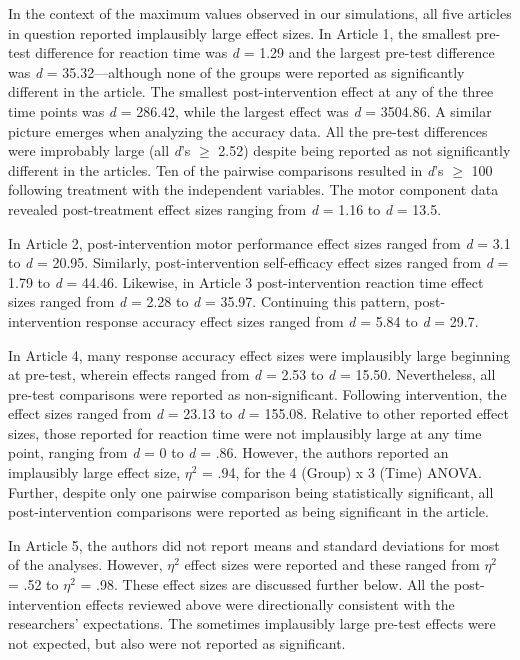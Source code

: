 \documentclass[
  english,
  man, donotrepeattitle,floatsintext]{apa7}
\begin{document}
In the context of the maximum values observed in our simulations, all five articles in question reported implausibly large effect sizes. In Article 1, the smallest pre-test difference for reaction time was \emph{d} = 1.29 and the largest pre-test difference was \emph{d} = 35.32---although none of the groups were reported as significantly different in the article. The smallest post-intervention effect at any of the three time points was \emph{d} = 286.42, while the largest effect was \emph{d} = 3504.86. A similar picture emerges when analyzing the accuracy data. All the pre-test differences were improbably large (all \emph{d}'s \(\geq\) 2.52) despite being reported as not significantly different in the articles. Ten of the pairwise comparisons resulted in \emph{d}'s \(\geq\) 100 following treatment with the independent variables. The motor component data revealed post-treatment effect sizes ranging from \emph{d} = 1.16 to \emph{d} = 13.5.

In Article 2, post-intervention motor performance effect sizes ranged from \emph{d} = 3.1 to \emph{d} = 20.95. Similarly, post-intervention self-efficacy effect sizes ranged from \emph{d} = 1.79 to \emph{d} = 44.46. Likewise, in Article 3 post-intervention reaction time effect sizes ranged from \emph{d} = 2.28 to \emph{d} = 35.97. Continuing this pattern, post-intervention response accuracy effect sizes ranged from \emph{d} = 5.84 to \emph{d} = 29.7.

In Article 4, many response accuracy effect sizes were implausibly large beginning at pre-test, wherein effects ranged from \emph{d} = 2.53 to \emph{d} = 15.50. Nevertheless, all pre-test comparisons were reported as non-significant. Following intervention, the effect sizes ranged from \emph{d} = 23.13 to \emph{d} = 155.08. Relative to other reported effect sizes, those reported for reaction time were not implausibly large at any time point, ranging from \emph{d} = 0 to \emph{d} = .86. However, the authors reported an implausibly large effect size, \(\eta^{2}\) = .94, for the 4 (Group) x 3 (Time) ANOVA. Further, despite only one pairwise comparison being statistically significant, all post-intervention comparisons were reported as being significant in the article.

In Article 5, the authors did not report means and standard deviations for most of the analyses. However, \(\eta^{2}\) effect sizes were reported and these ranged from \(\eta^{2}\) = .52 to \(\eta^{2}\) = .98. These effect sizes are discussed further below. All the post-intervention effects reviewed above were directionally consistent with the researchers' expectations. The sometimes implausibly large pre-test effects were not expected, but also were not reported as significant.
\end{document}
